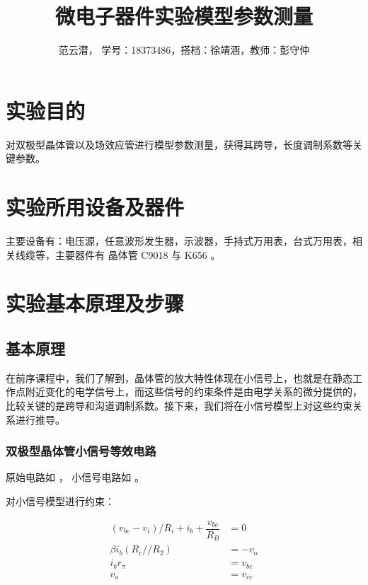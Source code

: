 \documentclass[lang=cn,11pt,a4paper,cite=authoryear]{elegantpaper}
\title{微电子器件实验\quad 模型参数测量}
\author{范云潜， 学号：18373486，搭档：徐靖涵，教师：彭守仲}
\institute{微电子学院 184111 班}
\date{\zhtoday}
\begin{document}
\maketitle


\section{实验目的}

对双极型晶体管以及场效应管进行模型参数测量，获得其跨导，长度调制系数等关键参数。

\section{实验所用设备及器件}


主要设备有：电压源，任意波形发生器，示波器，手持式万用表，台式万用表，相关线缆等，主要器件有 晶体管 C9018 与 K656 。

\section{实验基本原理及步骤}

\subsection{基本原理}

在前序课程中，我们了解到，晶体管的放大特性体现在小信号上，也就是在静态工作点附近变化的电学信号上，而这些信号的约束条件是由电学关系的微分提供的，比较关键的是跨导和沟道调制系数。接下来，我们将在小信号模型上对这些约束关系进行推导。

\subsubsection{双极型晶体管小信号等效电路}

原始电路如 ， 小信号电路如  。



对小信号模型进行约束： 

\[\begin{aligned}
    (v_{be} - v_i) / R_i + i_b + \dfrac{v_{be}}{R_B} &= 0 \\ 
    \beta i_b (R_c // R_2) &= - v_o \\ 
    i_b r_\pi &= v_{be} \\ 
    v_o &= v_{ce} \\
\end{aligned}\]
\end{document}
